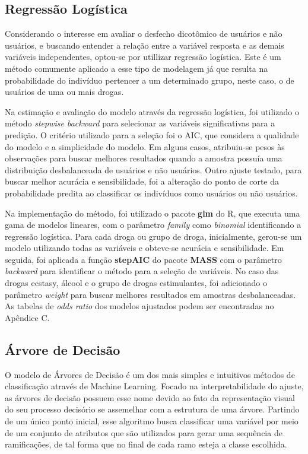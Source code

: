 \documentclass[
	article,			%
	11pt,				%
	oneside,			%
	a4paper,			%
	english,			%
	brazil,				%
	sumario=tradicional
	]{abntex2}
\begin{document}
\subsection{Regressão Logística}

 Considerando o interesse em avaliar o desfecho dicotômico de usuários e não usuários, e buscando entender a relação entre a variável resposta e as demais variáveis independentes, optou-se por utillizar regressão logística. Este é um método comumente aplicado a esse tipo de modelagem \cite{logreg} já que resulta na probabilidade do indivíduo pertencer a um determinado grupo, neste caso, o de usuários de uma ou mais drogas.
 
 Na estimação e avaliação do modelo através da regressão logística, foi utilizado o método \emph{stepwise backward} para selecionar as variáveis significativas para a predição. O critério utilizado para a seleção foi o AIC, que considera a qualidade do modelo e a simplicidade do modelo. Em alguns casos, atribuiu-se pesos às observações para buscar melhores resultados quando a amostra possuía uma distribuição desbalanceada de usuários e não usuários. Outro ajuste testado, para buscar melhor acurácia e sensibilidade, foi a alteração do ponto de corte da probabilidade predita ao classificar os indivíduos como usuários ou não usuários. 

Na implementação do método, foi utilizado o pacote \textbf{glm} do R, que executa uma gama de modelos lineares, com o parâmetro \emph{family} como \emph{binomial} identificando a regressão logística.
Para cada droga ou grupo de droga, inicialmente, gerou-se um modelo utilizando todas as variáveis e obteve-se acurácia e sensibilidade. Em seguida, foi aplicada a função \textbf{stepAIC} do pacote \textbf{MASS} com o parâmetro \emph{backward} para identificar o método para a seleção de variáveis. No caso das drogas ecstasy, álcool e o grupo de drogas estimulantes, foi adicionado o parâmetro \emph{weight} para buscar melhores resultados em amostras desbalanceadas. As tabelas de \textit{odds ratio} dos modelos ajustados podem ser encontradas no Apêndice C.

\subsection{Árvore de Decisão}

O modelo de Árvores de Decisão é um dos mais simples e intuitivos métodos de classificação através de Machine Learning. Focado na interpretabilidade do ajuste, as árvores de decisão possuem esse nome devido ao fato da representação visual do seu processo decisório se assemelhar com a estrutura de uma árvore. Partindo de um único ponto inicial, esse algoritmo busca classificar uma variável por meio de um conjunto de atributos que são utilizados para gerar uma sequência de ramificações, de tal forma que no final de cada ramo esteja a classe escolhida.
\end{document}
